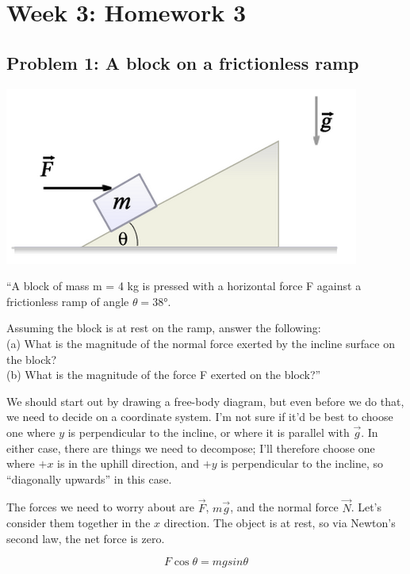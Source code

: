 \documentclass[8.01x]{subfiles}
\begin{document}
\chapter{Week 3: Homework 3}

\section{Problem 1: A block on a frictionless ramp}

\begin{center}
\includegraphics[scale=0.65]{Graphics/h3p1}
\end{center}

``A block of mass m = 4 kg is pressed with a horizontal force F against a frictionless ramp of angle $\theta = \ang{38}$.

Assuming the block is at rest on the ramp, answer the following:\\
(a) What is the magnitude of the normal force exerted by the incline surface on the block?\\
(b) What is the magnitude of the force F exerted on the block?''

We should start out by drawing a free-body diagram, but even before we do that, we need to decide on a coordinate system. I'm not sure if it'd be best to choose one where $y$ is perpendicular to the incline, or where it is parallel with $\vec{g}$. In either case, there are things we need to decompose; I'll therefore choose one where $+x$ is in the uphill direction, and $+y$ is perpendicular to the incline, so ``diagonally upwards'' in this case.

The forces we need to worry about are $\vec{F}$, $m \vec{g}$, and the normal force $\vec{N}$. Let's consider them together in the $x$ direction. The object is at rest, so via Newton's second law, the net force is zero.

\begin{equation}
F \cos \theta = m g sin \theta
\end{equation}
\end{document}
